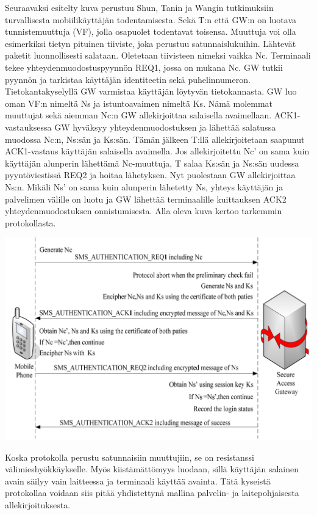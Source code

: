 \documentclass[finnish]{tktltiki2}
\theoremstyle{definition}
\theoremstyle{remark}
\begin{document}
Seuraavaksi esitelty kuva perustuu Shun, Tanin ja Wangin \cite{sms} tutkimuksiin turvallisesta mobiilikäyttäjän todentamisesta. Sekä T:n että GW:n on luotava tunnistemuuttuja (VF), jolla osapuolet todentavat toisensa. Muuttuja voi olla esimerkiksi tietyn pituinen tiiviste, joka perustuu satunnaislukuihin. Lähtevät paketit luonnollisesti salataan. Oletetaan tiivisteen nimeksi vaikka Nc. Terminaali tekee yhteydenmuodostuspyynnön REQ1, jossa on mukana Nc. GW tutkii pyynnön ja tarkistaa käyttäjän identiteetin sekä puhelinnumeron. Tietokantakyselyllä GW varmistaa käyttäjän löytyvän tietokannasta. GW luo oman VF:n nimeltä Ns ja istuntoavaimen nimeltä Ks. Nämä molemmat muuttujat sekä aiemman Nc:n GW allekirjoittaa salaisella avaimellaan. ACK1-vastauksessa GW hyväksyy yhteydenmuodostuksen ja lähettää salatussa muodossa Nc:n, Ns:sän ja Ks:sän. Tämän jälkeen T:llä allekirjoitetaan saapunut ACK1-vastaus käyttäjän salaisella avaimella. Jos allekirjoitettu Nc' on sama kuin käyttäjän alunperin lähettämä Nc-muuttuja, T salaa Ks:sän ja Ns:sän uudessa pyyntöviestissä REQ2 ja hoitaa lähetyksen. Nyt puolestaan GW allekirjoittaa Ns:n. Mikäli Ns' on sama kuin alunperin lähetetty Ns, yhteys käyttäjän ja palvelimen välille on luotu ja GW lähettää terminaalille kuittauksen ACK2 yhteydenmuodostuksen onnistumisesta. Alla oleva kuva kertoo tarkemmin protokollasta.   

\includegraphics[scale=0.4]{sms-todennus}

Koska protokolla perustu satunnaisiin muuttujiin, se on resistanssi välimieshyökkäykselle. Myös kiistämättömyys luodaan, sillä käyttäjän salainen avain säilyy vain laitteessa ja terminaali käyttää avainta. Tätä kyseistä protokollaa voidaan siis pitää yhdistettynä mallina palvelin- ja laitepohjaisesta allekirjoituksesta.
\end{document}
